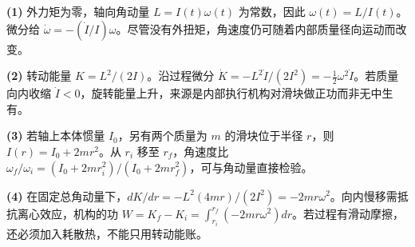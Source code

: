 \par\noindent\textbf{(1)} 外力矩为零，轴向角动量 \(L=I(t)\omega(t)\) 为常数，因此 \(\omega(t)=L/I(t)\)。微分给 \(\dot\omega=-(\dot I/I)\omega\)。尽管没有外扭矩，角速度仍可随着内部质量径向运动而改变。
\par\noindent\textbf{(2)} 转动能量 \(K=L^2/(2I)\)。沿过程微分 \(\dot K=-L^2\dot I/(2I^2)=-\tfrac12\omega^2\dot I\)。若质量向内收缩 \(\dot I<0\)，旋转能量上升，来源是内部执行机构对滑块做正功而非无中生有。
\par\noindent\textbf{(3)} 若轴上本体惯量 \(I_0\)，另有两个质量为 \(m\) 的滑块位于半径 \(r\)，则 \(I(r)=I_0+2mr^2\)。从 \(r_i\) 移至 \(r_f\)，角速度比 \(\omega_f/\omega_i=(I_0+2mr_i^2)/(I_0+2mr_f^2)\)，可与角动量直接检验。
\par\noindent\textbf{(4)} 在固定总角动量下，\(dK/dr=-L^2(4mr)/(2I^2)=-2mr\omega^2\)。向内慢移需抵抗离心效应，机构的功 \(W=K_f-K_i=\int_{r_i}^{r_f}(-2mr\omega^2)dr\)。若过程有滑动摩擦，还必须加入耗散热，不能只用转动能账。
